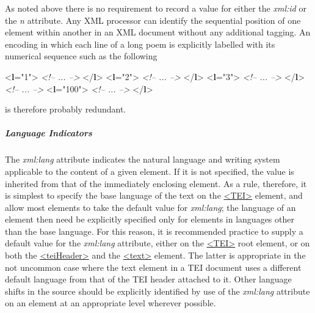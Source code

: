 As noted above there is no requirement to record a value for either the {\itshape xml:id} or the {\itshape n} attribute. Any XML processor can identify the sequential position of one element within another in an XML document without any additional tagging. An encoding in which each line of a long poem is explicitly labelled with its numerical sequence such as the following \par\bgroup{}\exampleFont \begin{shaded}\noindent\mbox{}{<\textbf{l}\hspace*{1em}{n}="{1}">}\mbox{}\newline 
\textit{<!-- ... -->}\mbox{}\newline 
{</\textbf{l}>}\mbox{}\newline 
{<\textbf{l}\hspace*{1em}{n}="{2}">}\mbox{}\newline 
\textit{<!-- ... -->}\mbox{}\newline 
{</\textbf{l}>}\mbox{}\newline 
{<\textbf{l}\hspace*{1em}{n}="{3}">}\mbox{}\newline 
\textit{<!-- ... -->}\mbox{}\newline 
{</\textbf{l}>}\mbox{}\newline 
\textit{<!-- ... -->}\mbox{}\newline 
{<\textbf{l}\hspace*{1em}{n}="{100}">}\mbox{}\newline 
\textit{<!-- ... -->}\mbox{}\newline 
{</\textbf{l}>}\end{shaded}\egroup\par \noindent  is therefore probably redundant.
\subparagraph[{Language Indicators}]{Language Indicators}\label{STGAla}\par
The {\itshape xml:lang} attribute indicates the natural language and writing system applicable to the content of a given element. If it is not specified, the value is inherited from that of the immediately enclosing element. As a rule, therefore, it is simplest to specify the base language of the text on the \hyperref[TEI.TEI]{<TEI>} element, and allow most elements to take the default value for {\itshape xml:lang}; the language of an element then need be explicitly specified only for elements in languages other than the base language. For this reason, it is recommended practice to supply a default value for the {\itshape xml:lang} attribute, either on the \hyperref[TEI.TEI]{<TEI>} root element, or on both the \hyperref[TEI.teiHeader]{<teiHeader>} and the \hyperref[TEI.text]{<text>} element. The latter is appropriate in the not uncommon case where the text element in a TEI document uses a different default language from that of the TEI header attached to it. Other language shifts in the source should be explicitly identified by use of the {\itshape xml:lang} attribute on an element at an appropriate level wherever possible.\par
